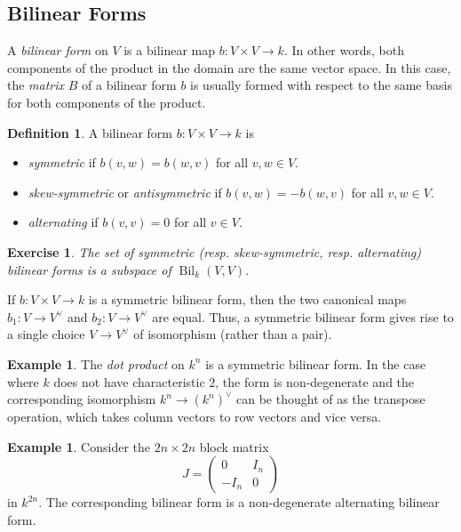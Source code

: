 \documentclass[12pt]{article}
\theoremstyle{plain}
\newtheorem{exercise}[theorem]{Exercise}
\theoremstyle{definition}
\newtheorem{definition}[theorem]{Definition}
\newtheorem{example}[theorem]{Example}
\theoremstyle{remark}
\numberwithin{equation}{section}
\begin{document}
\subsection{Bilinear Forms}

A \emph{bilinear form} on $V$ is a bilinear map $b : V \times V \to k$.
In other words, both components of the product in the domain are the
same vector space.
In this case, the \emph{matrix} $B$ of a bilinear form $b$ is usually formed
with respect to the same basis for both components of the product.

\begin{definition}
A bilinear form $b: V \times V \to k$ is
\begin{itemize}
\item \emph{symmetric} if $b(v,w)=b(w,v)$ for all $v,w \in V$.
\item \emph{skew-symmetric} or \emph{antisymmetric}
if $b(v,w)=-b(w,v)$ for all $v,w \in V$.
\item \emph{alternating} if $b(v,v)=0$ for all $v \in V$.
\end{itemize}
\end{definition}

\begin{exercise}
The set of symmetric (resp. skew-symmetric, resp. alternating) bilinear
forms is a subspace of $\operatorname{Bil}_k(V,V)$.
\end{exercise}

If $b: V \times V \to k$ is a symmetric bilinear form,
then the two canonical maps $b_1 : V \to V^\vee$ and $b_2 : V \to
V^\vee$ are equal.  Thus, a symmetric bilinear form gives rise to
a single choice $V \to V^\vee$ of isomorphism (rather than a pair).

\begin{example}
The \emph{dot product} on $k^n$ is a symmetric bilinear form.
In the case where $k$ does not have characteristic $2$, the form is
non-degenerate and the corresponding isomorphism
$k^n \to (k^n)^\vee$ can be thought of as the
transpose operation, which takes column vectors to row vectors and vice
versa.
\end{example}

\begin{example}
Consider the $2n \times 2n$ block matrix
\[
J = \begin{pmatrix} 0 & I_n \\ -I_n & 0 \end{pmatrix} 
\]
in $k^{2n}$.
The corresponding bilinear form is a non-degenerate alternating bilinear
form.
\end{example}
\end{document}
